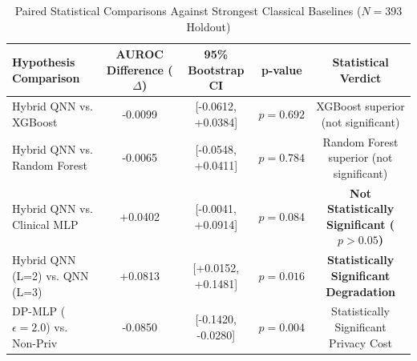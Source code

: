 \begin{table}[t]
\centering
\caption{Paired Statistical Comparisons Against Strongest Classical Baselines ($N=393$ Holdout)}
\label{tab:statistical_comparisons}
\begin{tabular}{lcccc}
\hline
\textbf{Hypothesis Comparison} & \textbf{AUROC Difference ($\Delta$)} & \textbf{95\% Bootstrap CI} & \textbf{p-value} & \textbf{Statistical Verdict} \\
\hline
Hybrid QNN vs. XGBoost & -0.0099 & [-0.0612, +0.0384] & $p = 0.692$ & XGBoost superior (not significant) \\
Hybrid QNN vs. Random Forest & -0.0065 & [-0.0548, +0.0411] & $p = 0.784$ & Random Forest superior (not significant) \\
Hybrid QNN vs. Clinical MLP & +0.0402 & [-0.0041, +0.0914] & $p = 0.084$ & \textbf{Not Statistically Significant ($p > 0.05$)} \\
Hybrid QNN (L=2) vs. QNN (L=3) & +0.0813 & [+0.0152, +0.1481] & \textbf{$p = 0.016$} & \textbf{Statistically Significant Degradation} \\
DP-MLP ($\epsilon=2.0$) vs. Non-Priv & -0.0850 & [-0.1420, -0.0280] & \textbf{$p = 0.004$} & Statistically Significant Privacy Cost \\
\hline
\end{tabular}
\end{table}
